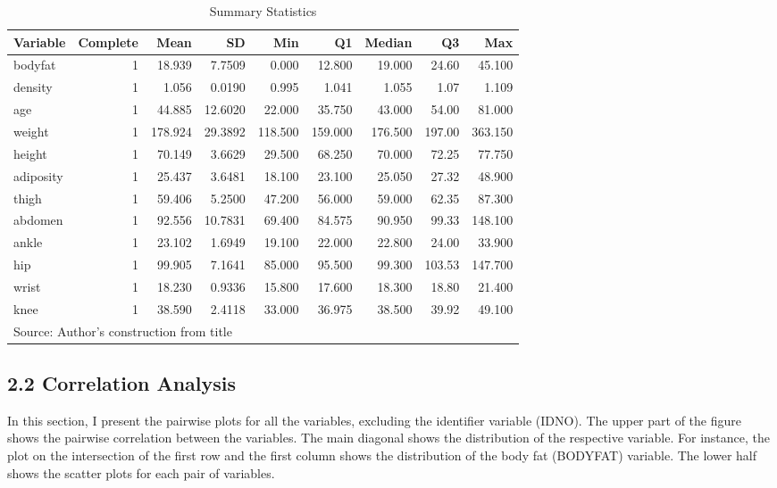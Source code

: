 \documentclass[
]{article}
\begin{document}
\begin{table}

\caption{\label{tab:unnamed-chunk-2}Summary Statistics}
\centering
\fontsize{12}{14}\selectfont
\begin{tabular}[t]{lrrrrrrrr}
\toprule
Variable & Complete & Mean & SD & Min & Q1 & Median & Q3 & Max\\
\midrule
bodyfat & 1 & 18.939 & 7.7509 & 0.000 & 12.800 & 19.000 & 24.60 & 45.100\\
density & 1 & 1.056 & 0.0190 & 0.995 & 1.041 & 1.055 & 1.07 & 1.109\\
age & 1 & 44.885 & 12.6020 & 22.000 & 35.750 & 43.000 & 54.00 & 81.000\\
weight & 1 & 178.924 & 29.3892 & 118.500 & 159.000 & 176.500 & 197.00 & 363.150\\
height & 1 & 70.149 & 3.6629 & 29.500 & 68.250 & 70.000 & 72.25 & 77.750\\
\addlinespace
adiposity & 1 & 25.437 & 3.6481 & 18.100 & 23.100 & 25.050 & 27.32 & 48.900\\
thigh & 1 & 59.406 & 5.2500 & 47.200 & 56.000 & 59.000 & 62.35 & 87.300\\
abdomen & 1 & 92.556 & 10.7831 & 69.400 & 84.575 & 90.950 & 99.33 & 148.100\\
ankle & 1 & 23.102 & 1.6949 & 19.100 & 22.000 & 22.800 & 24.00 & 33.900\\
hip & 1 & 99.905 & 7.1641 & 85.000 & 95.500 & 99.300 & 103.53 & 147.700\\
\addlinespace
wrist & 1 & 18.230 & 0.9336 & 15.800 & 17.600 & 18.300 & 18.80 & 21.400\\
knee & 1 & 38.590 & 2.4118 & 33.000 & 36.975 & 38.500 & 39.92 & 49.100\\
\bottomrule
\multicolumn{9}{l}{\rule{0pt}{1em}Source: Author's construction from title}\\
\end{tabular}
\end{table}

\hypertarget{correlation-analysis}{%
\subsection{\texorpdfstring{\textbf{2.2 Correlation
Analysis}}{2.2 Correlation Analysis}}\label{correlation-analysis}}

In this section, I present the pairwise plots for all the variables,
excluding the identifier variable (IDNO). The upper part of the figure
shows the pairwise correlation between the variables. The main diagonal
shows the distribution of the respective variable. For instance, the
plot on the intersection of the first row and the first column shows the
distribution of the body fat (BODYFAT) variable. The lower half shows
the scatter plots for each pair of variables.
\end{document}
